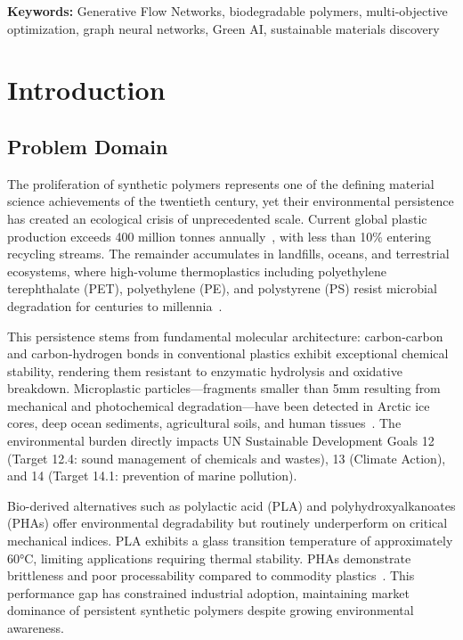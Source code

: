\documentclass[twocolumn,10pt]{article}
\begin{document}
\noindent\textbf{Keywords:} Generative Flow Networks, biodegradable polymers, multi-objective optimization, graph neural networks, Green AI, sustainable materials discovery

\section{Introduction}

\subsection{Problem Domain}

The proliferation of synthetic polymers represents one of the defining material science achievements of the twentieth century, yet their environmental persistence has created an ecological crisis of unprecedented scale. Current global plastic production exceeds 400 million tonnes annually~\cite{geyer2017production}, with less than 10\% entering recycling streams. The remainder accumulates in landfills, oceans, and terrestrial ecosystems, where high-volume thermoplastics including polyethylene terephthalate (PET), polyethylene (PE), and polystyrene (PS) resist microbial degradation for centuries to millennia~\cite{jambeck2015plastic}.

This persistence stems from fundamental molecular architecture: carbon-carbon and carbon-hydrogen bonds in conventional plastics exhibit exceptional chemical stability, rendering them resistant to enzymatic hydrolysis and oxidative breakdown. Microplastic particles—fragments smaller than 5mm resulting from mechanical and photochemical degradation—have been detected in Arctic ice cores, deep ocean sediments, agricultural soils, and human tissues~\cite{jambeck2015plastic}. The environmental burden directly impacts UN Sustainable Development Goals 12 (Target 12.4: sound management of chemicals and wastes), 13 (Climate Action), and 14 (Target 14.1: prevention of marine pollution).

Bio-derived alternatives such as polylactic acid (PLA) and polyhydroxyalkanoates (PHAs) offer environmental degradability but routinely underperform on critical mechanical indices. PLA exhibits a glass transition temperature of approximately 60°C, limiting applications requiring thermal stability. PHAs demonstrate brittleness and poor processability compared to commodity plastics~\cite{hillmyer2017promise}. This performance gap has constrained industrial adoption, maintaining market dominance of persistent synthetic polymers despite growing environmental awareness.
\end{document}
